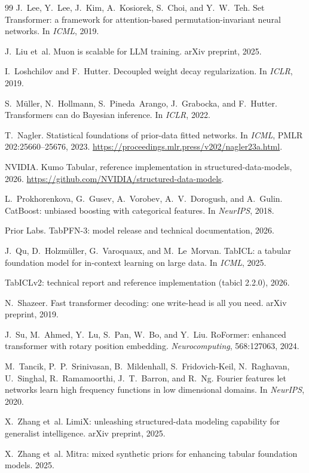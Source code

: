\documentclass[11pt]{article}
\begin{document}
\begin{thebibliography}{99}
 J.~Lee, Y.~Lee, J.~Kim, A.~Kosiorek, S.~Choi, and Y.~W.~Teh. Set Transformer: a
framework for attention-based permutation-invariant neural networks. In \emph{ICML}, 2019.

 J.~Liu et~al. Muon is scalable for LLM training. arXiv preprint, 2025.

 I.~Loshchilov and F.~Hutter. Decoupled weight decay regularization. In
\emph{ICLR}, 2019.

 S.~M\"uller, N.~Hollmann, S.~Pineda~Arango, J.~Grabocka, and F.~Hutter.
Transformers can do Bayesian inference. In \emph{ICLR}, 2022.

 T.~Nagler. Statistical foundations of prior-data fitted networks. In
\emph{ICML}, PMLR 202:25660--25676, 2023. \url{https://proceedings.mlr.press/v202/nagler23a.html}.

 NVIDIA. Kumo Tabular, reference implementation in structured-data-models, 2026.
\url{https://github.com/NVIDIA/structured-data-models}.

 L.~Prokhorenkova, G.~Gusev, A.~Vorobev, A.~V.~Dorogush, and A.~Gulin.
CatBoost: unbiased boosting with categorical features. In \emph{NeurIPS}, 2018.

 Prior Labs. TabPFN-3: model release and technical documentation, 2026.

 J.~Qu, D.~Holzm\"uller, G.~Varoquaux, and M.~Le~Morvan. TabICL: a tabular foundation
model for in-context learning on large data. In \emph{ICML}, 2025.

 TabICLv2: technical report and reference implementation (tabicl 2.2.0),
2026.

 N.~Shazeer. Fast transformer decoding: one write-head is all you need. arXiv
preprint, 2019.

 J.~Su, M.~Ahmed, Y.~Lu, S.~Pan, W.~Bo, and Y.~Liu. RoFormer: enhanced transformer
with rotary position embedding. \emph{Neurocomputing}, 568:127063, 2024.

 M.~Tancik, P.~P.~Srinivasan, B.~Mildenhall, S.~Fridovich-Keil, N.~Raghavan,
U.~Singhal, R.~Ramamoorthi, J.~T.~Barron, and R.~Ng. Fourier features let networks learn high
frequency functions in low dimensional domains. In \emph{NeurIPS}, 2020.

 X.~Zhang et~al. LimiX: unleashing structured-data modeling capability for generalist
intelligence. arXiv preprint, 2025.

 X.~Zhang et~al. Mitra: mixed synthetic priors for enhancing tabular foundation
models. 2025.

\end{thebibliography}
\end{document}
